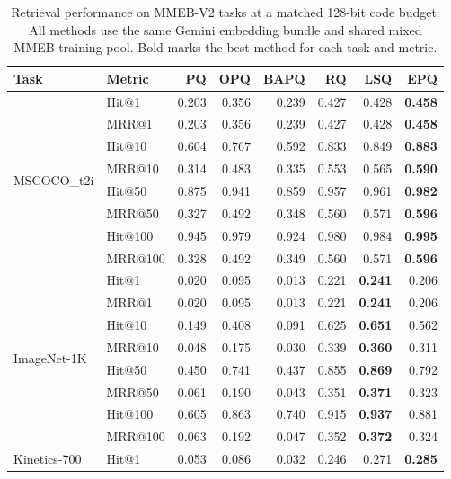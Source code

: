 \begin{table}[!t]
\centering
\scriptsize
\setlength{\tabcolsep}{3pt}
\renewcommand{\arraystretch}{1.0}
\caption{Retrieval performance on MMEB-V2 tasks at a matched 128-bit code budget. All methods use the same Gemini embedding bundle and shared mixed MMEB training pool. Bold marks the best method for each task and metric.}
\label{tab:mm-main}
\begin{tabular*}{\textwidth}{@{\extracolsep{\fill}}llrrrrrr@{}}
\toprule
Task & Metric & PQ & OPQ & BAPQ & RQ & LSQ & EPQ \\
\midrule
\multirow{8}{*}{MSCOCO\_t2i} & Hit@1 & 0.203 & 0.356 & 0.239 & 0.427 & 0.428 & \textbf{0.458} \\
 & MRR@1 & 0.203 & 0.356 & 0.239 & 0.427 & 0.428 & \textbf{0.458} \\
 & Hit@10 & 0.604 & 0.767 & 0.592 & 0.833 & 0.849 & \textbf{0.883} \\
 & MRR@10 & 0.314 & 0.483 & 0.335 & 0.553 & 0.565 & \textbf{0.590} \\
 & Hit@50 & 0.875 & 0.941 & 0.859 & 0.957 & 0.961 & \textbf{0.982} \\
 & MRR@50 & 0.327 & 0.492 & 0.348 & 0.560 & 0.571 & \textbf{0.596} \\
 & Hit@100 & 0.945 & 0.979 & 0.924 & 0.980 & 0.984 & \textbf{0.995} \\
 & MRR@100 & 0.328 & 0.492 & 0.349 & 0.560 & 0.571 & \textbf{0.596} \\
\midrule
\multirow{8}{*}{ImageNet-1K} & Hit@1 & 0.020 & 0.095 & 0.013 & 0.221 & \textbf{0.241} & 0.206 \\
 & MRR@1 & 0.020 & 0.095 & 0.013 & 0.221 & \textbf{0.241} & 0.206 \\
 & Hit@10 & 0.149 & 0.408 & 0.091 & 0.625 & \textbf{0.651} & 0.562 \\
 & MRR@10 & 0.048 & 0.175 & 0.030 & 0.339 & \textbf{0.360} & 0.311 \\
 & Hit@50 & 0.450 & 0.741 & 0.437 & 0.855 & \textbf{0.869} & 0.792 \\
 & MRR@50 & 0.061 & 0.190 & 0.043 & 0.351 & \textbf{0.371} & 0.323 \\
 & Hit@100 & 0.605 & 0.863 & 0.740 & 0.915 & \textbf{0.937} & 0.881 \\
 & MRR@100 & 0.063 & 0.192 & 0.047 & 0.352 & \textbf{0.372} & 0.324 \\
\midrule
\multirow{8}{*}{Kinetics-700} & Hit@1 & 0.053 & 0.086 & 0.032 & 0.246 & 0.271 & \textbf{0.285} \\

\end{tabular*}
\end{table}
